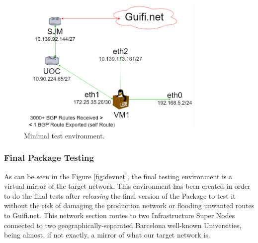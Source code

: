 \begin{figure}[H]
        \centering
        \includegraphics[width=0.8\textwidth]{images/devmin}
        \caption{Minimal test environment.}
        \label{fig:mindev}
	\end{figure}

\subsubsection{Final Package Testing}
As can be seen in the Figure \ref{fig:devnet}, the final testing environment is a virtual mirror of the target network. This environment has been created in order to do the final tests after \textit{releasing} the final version of the Package to test it without the risk of damaging the production network or flooding unwanted routes to Guifi.net. This network section routes to two Infrastructure Super Nodes connected to two geographically-separated Barcelona well-known Universities, being almost, if not exactly, a mirror of what our target network is.

